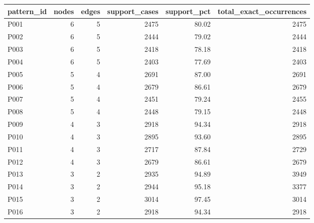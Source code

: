 \begin{tabular}{lrrrrr}
\toprule
pattern\_id & nodes & edges & support\_cases & support\_pct & total\_exact\_occurrences \\
\midrule
P001 & 6 & 5 & 2475 & 80.02 & 2475 \\
P002 & 6 & 5 & 2444 & 79.02 & 2444 \\
P003 & 6 & 5 & 2418 & 78.18 & 2418 \\
P004 & 6 & 5 & 2403 & 77.69 & 2403 \\
P005 & 5 & 4 & 2691 & 87.00 & 2691 \\
P006 & 5 & 4 & 2679 & 86.61 & 2679 \\
P007 & 5 & 4 & 2451 & 79.24 & 2455 \\
P008 & 5 & 4 & 2448 & 79.15 & 2448 \\
P009 & 4 & 3 & 2918 & 94.34 & 2918 \\
P010 & 4 & 3 & 2895 & 93.60 & 2895 \\
P011 & 4 & 3 & 2717 & 87.84 & 2729 \\
P012 & 4 & 3 & 2679 & 86.61 & 2679 \\
P013 & 3 & 2 & 2935 & 94.89 & 3949 \\
P014 & 3 & 2 & 2944 & 95.18 & 3377 \\
P015 & 3 & 2 & 3014 & 97.45 & 3014 \\
P016 & 3 & 2 & 2918 & 94.34 & 2918 \\
\bottomrule
\end{tabular}

